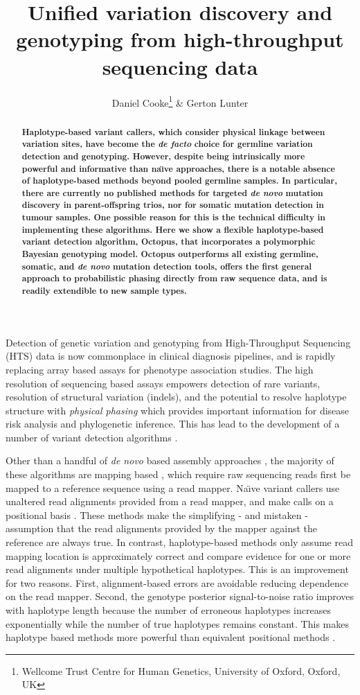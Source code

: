 \documentclass[notitlepage, twocolumn]{article}
\title{Unified variation discovery and genotyping from high-throughput sequencing data}
\author{Daniel Cooke\thanks{Wellcome Trust Centre for Human Genetics, University of Oxford, Oxford, UK} \&
Gerton Lunter\samethanks}
\date{}
\newcommand\invisiblesection[1]{%
  \refstepcounter{section}%
  \addcontentsline{toc}{section}{\protect\numberline{\thesection}#1}%
  \sectionmark{#1}\phantom{}}
\begin{document}
\maketitle
\thispagestyle{empty}

\begin{abstract}\textbf{
Haplotype-based variant callers, which consider physical linkage between variation sites, have become the \emph{de facto} choice for germline variation detection and genotyping. However, despite being intrinsically more powerful and informative than na\"\i ve approaches, there is a notable absence of haplotype-based methods beyond pooled germline samples. In particular, there are currently no published methods for targeted \emph{de novo} mutation discovery in parent-offspring trios, nor for somatic mutation detection in tumour samples. One possible reason for this is the technical difficulty in implementing these algorithms. Here we show a flexible haplotype-based variant detection algorithm, Octopus, that incorporates a polymorphic Bayesian genotyping model. Octopus outperforms all existing germline, somatic, and \emph{de novo} mutation detection tools, offers the first general approach to probabilistic phasing directly from raw sequence data, and is readily extendible to new sample types.
}\end{abstract}

\invisiblesection{Motivation}

Detection of genetic variation and genotyping from High-Throughput Sequencing (HTS) data is now commonplace in clinical diagnosis pipelines, and is rapidly replacing array based assays for phenotype association studies. The high resolution of sequencing based assays empowers detection of rare variants, resolution of structural variation (indels), and the potential to resolve haplotype structure with \emph{physical phasing} which provides important information for disease risk analysis and phylogenetic inference. This has lead to the development of a number of variant detection algorithms \cite{rare-variant}.

Other than a handful of \emph{de novo} based assembly approaches \cite{cortex}, the majority of these algorithms are mapping based \cite{gatk, freebayes, platypus}, which require raw sequencing reads first be mapped to a reference sequence using a read mapper. Na\"\i ve variant callers use unaltered read alignments provided from a read mapper, and make calls on a positional basis \cite{samtools}. These methods make the simplifying - and mistaken - assumption that the read alignments provided by the mapper against the reference are always true. In contrast, haplotype-based methods only assume read mapping location is approximately correct and compare evidence for one or more read alignments under multiple hypothetical haplotypes. This is an improvement for two reasons. First, alignment-based errors are avoidable reducing dependence on the read mapper. Second, the genotype posterior signal-to-noise ratio improves with haplotype length because the number of erroneous haplotypes increases exponentially while the number of true haplotypes remains constant. This makes haplotype based methods more powerful than equivalent positional methods \cite{haplotype-calling}.
\end{document}
